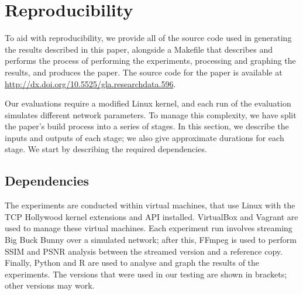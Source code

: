 \documentclass[sigconf]{acmart}
\begin{document}


\maketitle









\appendix

\section{Reproducibility}
\label{appendix:reproducibility}

To aid with reproducibility, we provide all of the source code used in generating the
results described in this paper, alongside a Makefile that describes and performs the
process of performing the experiments, processing and graphing the results, and produces
the paper. The source code for the paper is available at \url{http://dx.doi.org/10.5525/gla.researchdata.596}.

Our evaluations require a modified Linux kernel, and each run of the evaluation simulates
different network parameters. To manage this complexity, we have split the paper's build
process into a series of stages. In this section, we describe the inputs and outputs of
each stage; we also give approximate durations for each stage.
We start by describing the required dependencies.

\subsection*{Dependencies}

The experiments are conducted within virtual machines, that use Linux with the TCP
Hollywood kernel extensions and API installed. VirtualBox and Vagrant are used to manage
these virtual machines. Each experiment run involves streaming Big Buck Bunny over a 
simulated network; after this, FFmpeg is used to perform SSIM and PSNR analysis between
the streamed version and a reference copy. Finally, Python and R are used to analyse and
graph the results of the experiments. The versions that were used in our testing are shown
in brackets; other versions may work.
\end{document}

